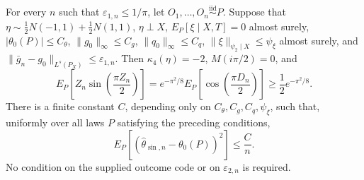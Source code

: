 For every \(n\) such that \(\varepsilon_{1,n}\le 1/\pi\), let \(O_1,\ldots,O_n\stackrel{\mathrm{iid}}{\sim}P\). Suppose that \(\eta\sim\tfrac12N(-1,1)+\tfrac12N(1,1)\), \(\eta\perp X\), \(E_P[\xi\mid X,T]=0\) almost surely, \(|\theta_0(P)|\le C_{\theta}\), \(\|g_0\|_{\infty}\le C_g\), \(\|q_0\|_{\infty}\le C_q\), \(\|\xi\|_{\psi_2\mid X}\le\psi_{\xi}\) almost surely, and \(\|\bar g_n-g_0\|_{L^s(P_X)}\le\varepsilon_{1,n}\). Then \(\kappa_4(\eta)=-2\), \(M(i\pi/2)=0\), and
\[
E_P\!\left[Z_n\sin\!\left(\frac{\pi Z_n}{2}\right)\right]
=e^{-\pi^2/8}E_P\!\left[\cos\!\left(\frac{\pi D_n}{2}\right)\right]
\ge \frac12e^{-\pi^2/8}.
\]
There is a finite constant \(C\), depending only on \(C_{\theta},C_g,C_q,\psi_{\xi}\), such that, uniformly over all laws \(P\) satisfying the preceding conditions,
\[
E_P\!\left[(\widehat\theta_{\sin,n}-\theta_0(P))^2\right]\le \frac{C}{n}.
\]
No condition on the supplied outcome code or on \(\varepsilon_{2,n}\) is required.